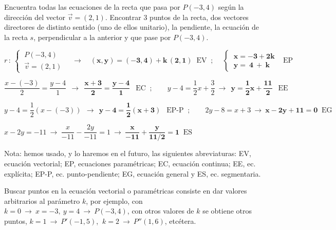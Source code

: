 \vspace{5mm}
\begin{miejemplo}

 Encuentra todas las ecuaciones de la recta que pasa por $P(-3,4)$ según la dirección del vector $\vec v=(2,1)$. Encontrar 3 puntos de la recta, dos vectores directores de distinto sentido (uno de ellos unitario), la pendiente, la ecuación de la recta $s$, perpendicular a la anterior y que pase por $P(-3,4)$.     
 

\vspace{6mm} $r\, : \ \begin{cases} \ P(-3,4) \\ \ \vec v=(2,1) \end{cases} \quad \to \quad \boldsymbol{(x,y)=(-3,4)+k\, (2,1)} \ \text{ EV } \ ; \ \quad \boldsymbol{ \begin{cases} \ x=-3+2k \\ \ y=\ 4\ + \ k \end{cases} } \ \ \text{ EP }$

\vspace{2mm} $\dfrac{x-(-3)}{2}=\dfrac{y-4}{1} \ \  \to \ \ \boldsymbol{ \dfrac{x+3}{2}=\dfrac{y-4}{1} } \ \ \text{ EC } \ ; \qquad y-4=\dfrac 1 2x + \dfrac 3 2 \ \to \ \ \boldsymbol{y=\dfrac 1 2 x+ \dfrac{11}2 }\ \ \text{ EE }$

\vspace{2mm} $y-4=\dfrac 1 2 (x-(-3)) \ \ \to \ \ \boldsymbol{ y-4=\dfrac 1 2 (x+3)}\ \ \text{ EP-P }\ ; \qquad 2y-8=x+3 \ \to \ \boldsymbol{x-2y+11=0}\ \text{\ EG} $

\vspace{2mm} $x-2y=-11 \ \to \ \dfrac{x}{-11}-\dfrac{2y}{-11}=1 \ \to \ \boldsymbol{ \dfrac{x}{-11}+\dfrac{y}{11/2}=1 } \ \text{ ES } $

\vspace{2mm} Nota: hemos usado, y lo haremos en el futuro, las siguientes abreviaturas: EV, ecuación vectorial; EP, ecuaciones paramétricas; EC, ecuación continua; EE, ec. explícita; EP-P, ec. punto-pendiente; EG, ecuación general y ES, ec. segmentaria.

\vspace{2mm} Buscar puntos en la ecuación vectorial o paramétricas consiste en dar valores arbitrarios al parámetro $k$, por ejemplo, con $k=0\ \to \ x=-3,\ y=4 \ \to \ P(-3,4)$, con otros valores de $k$ se obtiene otros puntos, $k=1 \ \to \ P'(-1,5)$, $\ k=2 \ \to \ P''(1,6)$, etcétera. 


\end{miejemplo}
